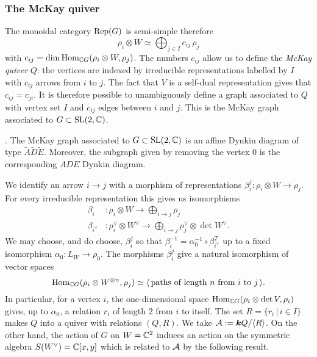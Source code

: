 \documentclass{amsart}
\theoremstyle{definition}
\begin{document}
\subsubsection{The McKay quiver}
The monoidal category $\operatorname{Rep}(G)$ is semi-simple therefore $$\rho_i \otimes W \simeq \bigoplus_{j \in I} c_{ij} \, \rho_j$$
with $c_{ij} =\dim \operatorname{Hom}_{\mathbb{C} G}(\rho_i \otimes W, \rho_j)$.
The numbers $c_{ij}$ allow us to define the {\em McKay quiver} $Q$: the vertices are indexed by irreducible representations labelled by $I$ with $c_{ij}$  arrows from $i$ to $j$.
The fact that $V$ is a self-dual representation gives that $c_{ij} = c_{ji}$.
It is therefore possible to unambiguously define a graph associated to $Q$ with vertex set $I$ and $c_{ij}$ edges between $i$ and $j$.
This is the McKay graph associated to $G \subset \operatorname{SL}(2,\mathbb{C})$.

\begin{theorem}\cite{MR604577}.
The McKay graph associated to $G \subset \operatorname{SL}(2,\mathbb{C})$ is an affine Dynkin diagram of type $\widetilde{A}\widetilde{D}\widetilde{E}$.
Moreover, the subgraph given by removing the vertex $0$ is the corresponding $ADE$ Dynkin diagram.
\end{theorem}

We identify an arrow $i \rightarrow j$ with a morphism of representations $\beta_i^j \colon \rho_i \otimes W \rightarrow \rho_j$.
For every irreducible representation this gives us isomorphisms 
\begin{align}
    \beta_i &\colon \rho_i \otimes W \longrightarrow \bigoplus_{i \rightarrow j} \rho_j \\
    \beta_{i^\vee} &\colon \rho_i^\vee \otimes W^\vee \longrightarrow \bigoplus_{i \rightarrow j} \rho_j^\vee \otimes \det W^\vee.
\end{align}
We may choose, and do choose, $\beta_i^j$ so that $\beta_i^{-1} = \alpha_0^{-1} \circ \beta_{i^\vee}^T$ up to a fixed isomorphism $\alpha_0 \colon L_W \rightarrow \rho_0$.
The morphisms $\beta_i^j$ give a natural isomorphism of vector spaces $$\operatorname{Hom}_{\mathbb{C} G}(\rho_i \otimes W^{\otimes n}, \rho_j) \simeq \langle\, \text{paths of length }n \text{ from }i \text{ to } j\,\rangle.$$
In particular, for a vertex $i$, the one-dimensional space $\operatorname{Hom}_{\mathbb{C} G} (\rho_i \otimes \operatorname{det}{V}, \rho_i)$ gives, up to $\alpha_0$, a relation $r_i$ of length 2 from $i$ to itself.
The set $R = \{r_i \, |\, i \in I\}$ makes $Q$ into a quiver with relations $(Q, R)$. 
We take $\mathcal{A}:= {\boldsymbol{k}} Q/ \langle R\rangle$.
On the other hand, the action of $G$ on $W=\mathbb{C}^2$ induces an action on the symmetric algebra $S(W^\vee)=\mathbb{C}[x,y]$ which is related to $\mathcal{A}$ by the following result.
\end{document}
